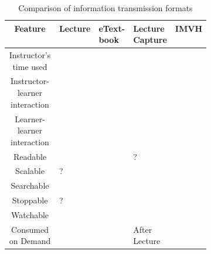 \documentclass[12pt]{article}
\begin{document}

\begin{table}
	\caption{Comparison of information transmission formats} \label{tech_comparison}
	\centering
	\begin{tabular}{|c*{4}{|>{\centering\arraybackslash}m{0.1\linewidth}}|}
		\hline
		Feature & Lecture & eText-book & Lecture Capture & IMVH\\
		\hline
		Instructor's time used & \checkmark & & &\\
		Instructor-learner interaction & \checkmark & & &\\
		Learner-learner interaction & \checkmark & & & \\
		Readable & & \checkmark & ? & \checkmark \\
		Scalable & ? & \checkmark & \checkmark & \checkmark \\
		Searchable & & \checkmark & & \checkmark \\
		Stoppable & ? & \checkmark & \checkmark & \checkmark \\
		Watchable & \checkmark & & \checkmark & \checkmark \\
		Consumed on Demand & & \checkmark & After Lecture &\checkmark \\
		\hline

	\end{tabular}
	\label{infotransmission}
\end{table}
\end{document}
